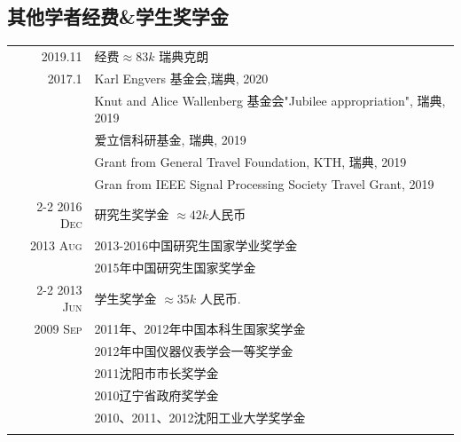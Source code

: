 \documentclass[a4paper,10pt]{article}
\begin{document}
\subsection{其他学者经费\&学生奖学金}
\begin{savenotes}
  \begin{longtable}{r|p{13cm}}
    \textsc{2019.11} & 经费$\approx 83k$ 瑞典克朗\\
    \textsc{2017.1} & Karl Engvers 基金会,瑞典, 2020 \\
                      & Knut and Alice Wallenberg 基金会"Jubilee appropriation", 瑞典, 2019 \\
                      & 爱立信科研基金, 瑞典, 2019 \\
                      & Grant from General Travel Foundation, KTH, 瑞典, 2019 \\
                      & Gran from IEEE Signal Processing Society Travel Grant, 2019 \\
    \cline{2-2}
    \textsc{2016 Dec} & 研究生奖学金 $\approx 42k$人民币 \\
    \textsc{2013 Aug} &2013-2016中国研究生国家学业奖学金  \\
                      & 2015年中国研究生国家奖学金\\
    \cline{2-2}
    \textsc{2013 Jun}	& 学生奖学金 $\approx 35k$ 人民币.\\
    \textsc{2009 Sep}	& 2011年、2012年中国本科生国家奖学金\\
                      & 2012年中国仪器仪表学会一等奖学金\\
                      & 2011沈阳市市长奖学金\\
                      & 2010辽宁省政府奖学金\\
                      & 2010、2011、2012沈阳工业大学奖学金\\
    \multicolumn{2}{c}{} \\

  \end{longtable}
\end{savenotes}
\end{document}
